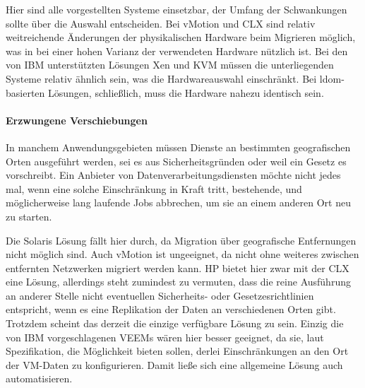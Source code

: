 Hier sind alle vorgestellten Systeme einsetzbar, der Umfang der
Schwankungen sollte über die Auswahl entscheiden. Bei vMotion und
\ac{CLX} sind relativ weitreichende Änderungen der physikalischen
Hardware beim Migrieren möglich, was in bei einer hohen Varianz der
verwendeten Hardware nützlich ist. Bei den von IBM unterstützten
Lösungen Xen und \ac{KVM} müssen die unterliegenden Systeme relativ
ähnlich sein, was die Hardwareauswahl einschränkt. Bei
\ac{ldom}-basierten Lösungen, schließlich, muss die Hardware nahezu
identisch sein.


\paragraph*{Erzwungene Verschiebungen}
In manchem Anwendungsgebieten müssen Dienste an bestimmten
geografischen Orten ausgeführt werden, sei es aus Sicherheitsgründen
oder weil ein Gesetz es vorschreibt. Ein Anbieter von
Datenverarbeitungsdiensten möchte nicht jedes mal, wenn eine solche
Einschränkung in Kraft tritt, bestehende, und möglicherweise lang
laufende Jobs abbrechen, um sie an einem anderen Ort neu zu starten.

Die Solaris Lösung fällt hier durch, da Migration über geografische
Entfernungen nicht möglich sind. Auch vMotion ist ungeeignet, da nicht
ohne weiteres zwischen entfernten Netzwerken migriert werden kann. HP
bietet hier zwar mit der \ac{CLX} eine Lösung, allerdings steht
zumindest zu vermuten, dass die reine Ausführung an anderer Stelle
nicht eventuellen Sicherheits- oder Gesetzesrichtlinien entspricht,
wenn es eine Replikation der Daten an verschiedenen Orten
gibt. Trotzdem scheint das derzeit die einzige verfügbare Lösung zu
sein.  Einzig die von IBM vorgeschlagenen \acp{VEEM} wären hier besser
geeignet, da sie, laut Spezifikation, die Möglichkeit bieten sollen,
derlei Einschränkungen an den Ort der \ac{VM}-Daten zu konfigurieren. Damit
ließe sich eine allgemeine Lösung auch automatisieren.


